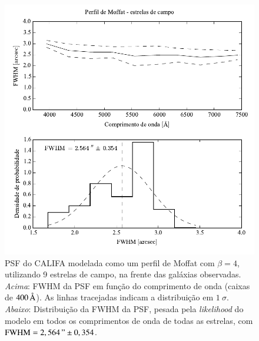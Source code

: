 \begin{figure}
	\includegraphics{figuras/PSFMoffatBeta4_field}
	\caption[PSF do CALIFA -- estrelas de campo.]
	{PSF do CALIFA modelada como um perfil de Moffat com $\beta=4$, utilizando 9
	estrelas de campo, na frente das galáxias observadas. {\em Acima}: FWHM da PSF
	em função do comprimento de onda (caixas de $400\,\text{\normalfont\AA}$). As linhas
	tracejadas indicam a distribuição em $1\ \sigma$. {\em Abaixo}: Distribuição da
	FWHM da PSF, pesada pela {\em likelihood} do modelo em todos os comprimentos de
	onda de todas as estrelas, com $\mathrm{FWHM}=2,564\," \pm 0,354$.}
	\label{fig:PSFField}
\end{figure}

